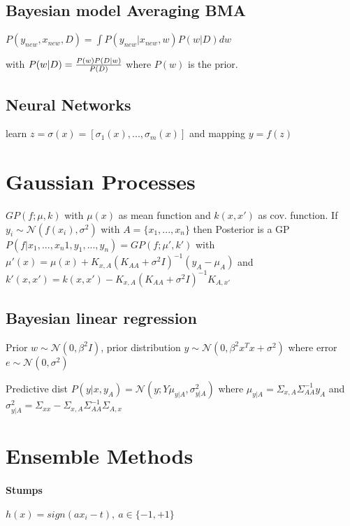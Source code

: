 \documentclass[11pt,twocolumn]{article}
\begin{document}



\subsection{Bayesian model Averaging BMA}

$P(y_{new}, x_{new}, D) = \int  P(y_{new}|x_{new}, w) P(w|D) dw$

with $P(w|D) = {{P(w) P(D|w)} \over {P(D)}}$ where $P(w)$ is the prior. 


\subsection{Neural Networks}
learn $z = \sigma(x) = [\sigma_1(x),...,\sigma_m(x)] $ and mapping $y=f(z)$

\section{Gaussian Processes}

$GP(f; \mu, k)$ with $\mu(x)$ as mean function and $k(x,x')$ as cov. function. If $y_i \sim \mathcal{N}(f(x_i), \sigma^2)$ with $A = \lbrace x_1,...,x_n \rbrace$ then Posterior is a GP $P(f|x_1,...,x_n1,y_1,...,y_n) = GP(f;\mu' , k' )$ with $\mu'(x) = \mu(x) + K _{x,A}(K_{AA}+\sigma^2 I)^{-1}(y_A - \mu_A)$ and $k' (x,x' ) = k(x,x')  - K_{x,A}(K_{AA} + \sigma^2I )^{-1} K_{A,x'}$



\subsection{Bayesian linear regression}

Prior $w \sim \mathcal{N}(0, \beta^2I)$, prior distribution $y \sim \mathcal{N}(0,\beta^2x^Tx+\sigma^2)$ where error $e \sim \mathcal{N}(0,\sigma^2)$

Predictive dist $P(y|x,y_A) 
= \mathcal{N}(y;Y \mu_{y|A}, \sigma^2_{y|A})$ where $\mu_{y|A} = \Sigma_{x,A} \Sigma^{-1}_{AA}y_A$ and $\sigma_{y|A}^2 = \Sigma_{xx}-\Sigma_{x,A} \Sigma^{-1}_{AA} \Sigma_{A,x}$



\section{Ensemble Methods}

\paragraph{Stumps}
$h(x) = sign(ax_i - t), ~a \in \lbrace-1,+1\rbrace $ 
\end{document}
